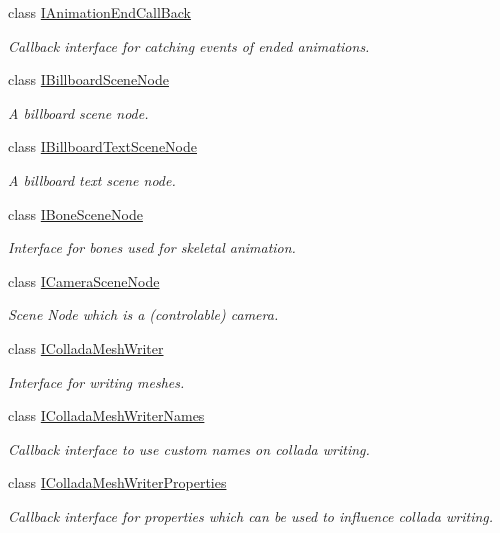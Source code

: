 \begin{DoxyCompactItemize}
class \hyperlink{classirr_1_1scene_1_1IAnimationEndCallBack}{I\+Animation\+End\+Call\+Back}
\begin{DoxyCompactList}\small\item\em Callback interface for catching events of ended animations. \end{DoxyCompactList}\item 
class \hyperlink{classirr_1_1scene_1_1IBillboardSceneNode}{I\+Billboard\+Scene\+Node}
\begin{DoxyCompactList}\small\item\em A billboard scene node. \end{DoxyCompactList}\item 
class \hyperlink{classirr_1_1scene_1_1IBillboardTextSceneNode}{I\+Billboard\+Text\+Scene\+Node}
\begin{DoxyCompactList}\small\item\em A billboard text scene node. \end{DoxyCompactList}\item 
class \hyperlink{classirr_1_1scene_1_1IBoneSceneNode}{I\+Bone\+Scene\+Node}
\begin{DoxyCompactList}\small\item\em Interface for bones used for skeletal animation. \end{DoxyCompactList}\item 
class \hyperlink{classirr_1_1scene_1_1ICameraSceneNode}{I\+Camera\+Scene\+Node}
\begin{DoxyCompactList}\small\item\em Scene Node which is a (controlable) camera. \end{DoxyCompactList}\item 
class \hyperlink{classirr_1_1scene_1_1IColladaMeshWriter}{I\+Collada\+Mesh\+Writer}
\begin{DoxyCompactList}\small\item\em Interface for writing meshes. \end{DoxyCompactList}\item 
class \hyperlink{classirr_1_1scene_1_1IColladaMeshWriterNames}{I\+Collada\+Mesh\+Writer\+Names}
\begin{DoxyCompactList}\small\item\em Callback interface to use custom names on collada writing. \end{DoxyCompactList}\item 
class \hyperlink{classirr_1_1scene_1_1IColladaMeshWriterProperties}{I\+Collada\+Mesh\+Writer\+Properties}
\begin{DoxyCompactList}\small\item\em Callback interface for properties which can be used to influence collada writing. \end{DoxyCompactList}\item 

\end{DoxyCompactItemize}

